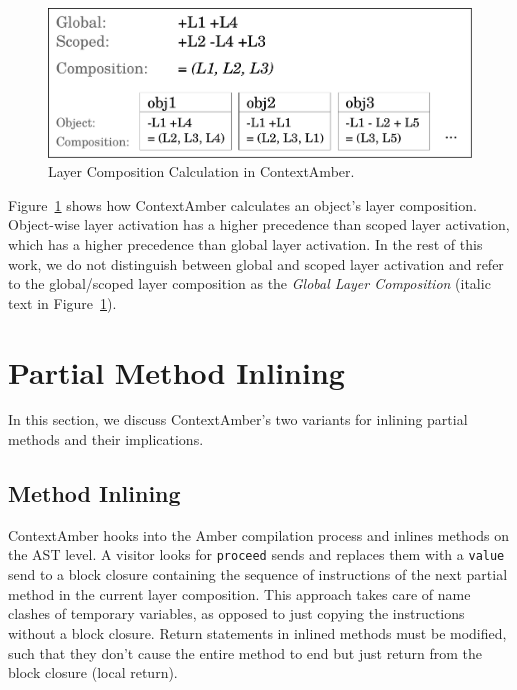 \documentclass{sig-alternate}
\newcommand{\todo}[1]{{\color{red}[[TODO: {\emph{#1}}]]}}
\begin{document}
\begin{figure}[!htp]
    \includegraphics[width=\columnwidth]{layer_composition_calculation.pdf}
    \caption{Layer Composition Calculation in ContextAmber.}
    \label{fig:layer_composition_calculation}
\end{figure}

Figure~\ref{fig:layer_composition_calculation} shows how ContextAmber calculates an object's layer composition. Object-wise layer activation has a higher precedence than scoped layer activation, which has a higher precedence than global layer activation. In the rest of this work, we do not distinguish between global and scoped layer activation and refer to the global/scoped layer composition as the \emph{Global Layer Composition} (italic text in Figure~\ref{fig:layer_composition_calculation}).

\section{Partial Method Inlining}
\label{sec:inlining}
\label{sec:partial_method_inlining}
In this section, we discuss ContextAmber's two variants for inlining partial methods and their implications.

\subsection{Method Inlining}
ContextAmber hooks into the Amber compilation process and inlines methods on the AST level. A visitor looks for \texttt{proceed} sends and replaces them with a \texttt{value} send to a block closure containing the sequence of instructions of the next partial method in the current layer composition. This approach takes care of name clashes of temporary variables, as opposed to just copying the instructions without a block closure. Return statements in inlined methods must be modified, such that they don't cause the entire method to end but just return from the block closure (local return). 
\end{document}
